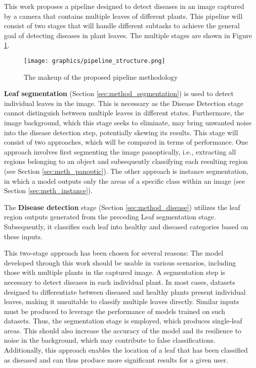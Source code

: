 \documentclass[draft,final]{vutinfth} %
\begin{document}
This work proposes a pipeline designed to detect diseases in an image captured by a camera that contains multiple leaves of different plants.
This pipeline will consist of two stages that will handle different subtasks to achieve the general goal of detecting diseases in plant leaves. The multiple stages are shown in Figure \ref{fig:method_pipeline}.

\begin{figure}
    \centering
    \texttt{[image: graphics/pipeline\_structure.png]}
    \caption{The makeup of the proposed pipeline methodology}
    \label{fig:method_pipeline}
\end{figure}


\textbf{Leaf segmentation} (Section \ref{sec:method_segmentation}) is used to detect individual leaves in the image. This is necessary as the Disease Detection stage cannot distinguish between multiple leaves in different states. Furthermore, the image background, which this stage seeks to eliminate, may bring unwanted noise into the disease detection step, potentially skewing its results. This stage will consist of two approaches, which will be compared in terms of performance. One approach involves first segmenting the image panoptically, i.e., extracting all regions belonging to an object and subsequently classifying each resulting region (see Section \ref{sec:meth_panoptic}). The other approach is instance segmentation, in which a model outputs only the areas of a specific class within an image (see Section \ref{sec:meth_instance}).

The \textbf{Disease detection} stage (Section \ref{sec:method_disease}) utilizes the leaf region outputs generated from the preceding Leaf segmentation stage. Subsequently, it classifies each leaf into healthy and diseased categories based on these inputs.

This two-stage approach has been chosen for several reasons: The model developed through this work should be usable in various scenarios, including those with multiple plants in the captured image. A segmentation step is necessary to detect diseases in each individual plant. In most cases, datasets designed to differentiate between diseased and healthy plants present individual leaves, making it unsuitable to classify multiple leaves directly. Similar inputs must be produced to leverage the performance of models trained on such datasets. Thus, the segmentation stage is employed, which produces single-leaf areas. This should also increase the accuracy of the model and its resilience to noise in the background, which may contribute to false classifications. Additionally, this approach enables the location of a leaf that has been classified as diseased and can thus produce more significant results for a given user.
\end{document}
